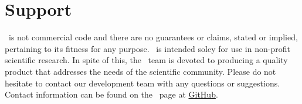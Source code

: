 \section{Support}
\MMSP\ is not commercial code and there are no guarantees or claims, stated or implied, pertaining to its fitness for any purpose.  \MMSP\ is intended soley for use in non-profit scientific research.  In spite of this, the \MMSP\ team is devoted to producing a quality product that addresses the needs of the scientific community.  Please do not hesitate to contact our development team with any questions or suggestions.  Contact information can be found on the \MMSP\ page at \href{https://github.com/mesoscale}{GitHub}.

